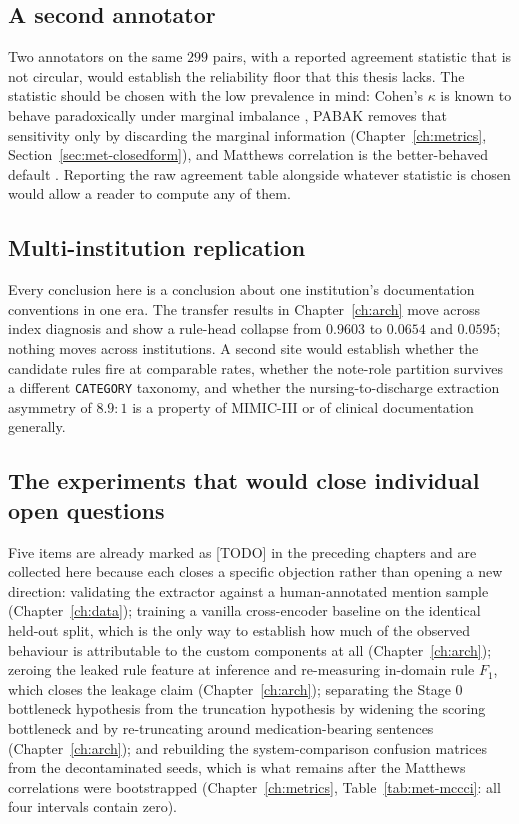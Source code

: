\subsection{A second annotator}

Two annotators on the same $299$ pairs, with a reported agreement statistic that
is not circular, would establish the reliability floor that this thesis lacks.
The statistic should be chosen with the low prevalence in mind: Cohen's $\kappa$
is known to behave paradoxically under marginal imbalance
\citep{feinstein1990paradoxes,cicchetti1990resolving}, PABAK removes that
sensitivity only by discarding the marginal information
(Chapter~\ref{ch:metrics}, Section~\ref{sec:met-closedform}), and Matthews
correlation is the better-behaved default \citep{chicco2020mcc,delgado2019kappa}.
Reporting the raw agreement table alongside whatever statistic is chosen would
allow a reader to compute any of them.

\subsection{Multi-institution replication}

Every conclusion here is a conclusion about one institution's documentation
conventions in one era. The transfer results in Chapter~\ref{ch:arch} move
across index diagnosis and show a rule-head collapse from $0.9603$ to $0.0654$
and $0.0595$; nothing moves across institutions. A second site would establish
whether the candidate rules fire at comparable rates, whether the note-role
partition survives a different \texttt{CATEGORY} taxonomy, and whether the
nursing-to-discharge extraction asymmetry of $8.9{:}1$ is a property of MIMIC-III
or of clinical documentation generally.

\subsection{The experiments that would close individual open questions}

Five items are already marked as [TODO] in the preceding chapters and are
collected here because each closes a specific objection rather than opening a
new direction: validating the extractor against a human-annotated mention sample
(Chapter~\ref{ch:data}); training a vanilla cross-encoder baseline on the
identical held-out split, which is the only way to establish how much of the
observed behaviour is attributable to the custom components at all
(Chapter~\ref{ch:arch}); zeroing the leaked rule feature at inference and
re-measuring in-domain rule $F_1$, which closes the leakage claim
(Chapter~\ref{ch:arch}); separating the Stage 0 bottleneck hypothesis from the
truncation hypothesis by widening the scoring bottleneck and by re-truncating
around medication-bearing sentences (Chapter~\ref{ch:arch}); and rebuilding the
system-comparison confusion matrices from the decontaminated seeds, which is what
remains after the Matthews correlations were bootstrapped
(Chapter~\ref{ch:metrics}, Table~\ref{tab:met-mccci}: all four intervals contain
zero).

